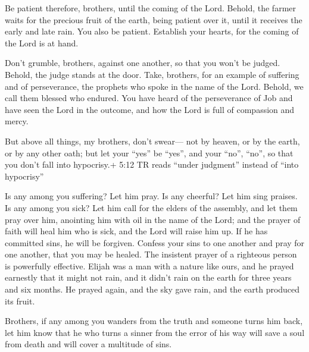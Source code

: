  Be patient therefore, brothers, until the coming of the
Lord. Behold, the farmer waits for the precious fruit of the earth,
being patient over it, until it receives the early and late rain.
 You also be patient. Establish your hearts, for the coming
of the Lord is at hand.

 Don't grumble, brothers, against one another, so that you
won't be judged. Behold, the judge stands at the door. 
Take, brothers, for an example of suffering and of perseverance, the
prophets who spoke in the name of the Lord.  Behold, we
call them blessed who endured. You have heard of the perseverance of Job
and have seen the Lord in the outcome, and how the Lord is full of
compassion and mercy.

 But above all things, my brothers, don't swear--- not by
heaven, or by the earth, or by any other oath; but let your ``yes'' be
``yes'', and your ``no'', ``no'', so that you don't fall into
hypocrisy.+ 5:12 TR reads ``under judgment'' instead of ``into
hypocrisy''

 Is any among you suffering? Let him pray. Is any cheerful?
Let him sing praises.  Is any among you sick? Let him call
for the elders of the assembly, and let them pray over him, anointing
him with oil in the name of the Lord;  and the prayer of
faith will heal him who is sick, and the Lord will raise him up. If he
has committed sins, he will be forgiven.  Confess your sins
to one another and pray for one another, that you may be healed. The
insistent prayer of a righteous person is powerfully effective.
 Elijah was a man with a nature like ours, and he prayed
earnestly that it might not rain, and it didn't rain on the earth for
three years and six months.  He prayed again, and the sky
gave rain, and the earth produced its fruit.

 Brothers, if any among you wanders from the truth and
someone turns him back,  let him know that he who turns a
sinner from the error of his way will save a soul from death and will
cover a multitude of sins.

